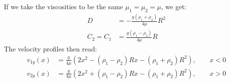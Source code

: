 \documentclass[a4paper]{report}
\begin{document}
If we take the viscosities to be the same $\mu_1 = \mu_2 = \mu$, we get:
\begin{align}
	D &= -\frac{g (\rho_1 + \rho_2)}{4 \mu} R^2 \\
	C_2 = C_1 &= \frac{g (\rho_1 - \rho_2)}{4 \mu} R
\end{align}
The velocity profiles then read:
\begin{align}
	v_{1y}(x) &= \frac{g}{4 \mu} \left(2 x^2 - (\rho_1 - \rho_2) R x - (\rho_1 + \rho_2) R^2\right),\qquad x < 0\\
	v_{2y}(x) &= \frac{g}{4 \mu} \left(2 x^2 + (\rho_1 - \rho_2) R x - (\rho_1 + \rho_2) R^2\right),\qquad x > 0 
\end{align}
\end{document}
